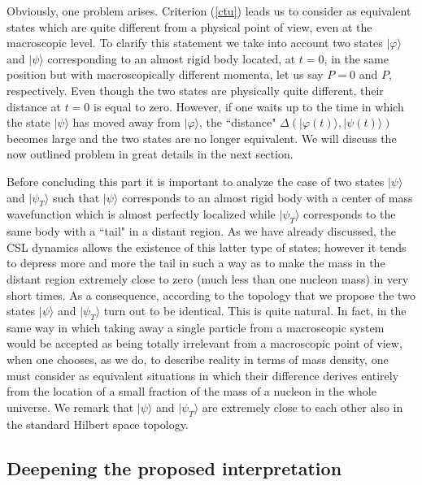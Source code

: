 \documentclass[10pt,a4paper]{article}
\begin{document}
Obviously, one problem arises. Criterion (\ref{ctu}) leads us to
consider as equivalent states which are quite different from a
physical point of view, even at the macroscopic level. To clarify
this statement we take into account two states $|\varphi\rangle$
and $|\psi\rangle$ corresponding to an almost rigid body located,
at $t = 0$, in the same position but with macroscopically
different momenta, let us say $P = 0$ and $P$, respectively. Even
though the two states are physically quite different, their
distance at $t = 0$ is equal to zero. However, if one waits up to
the time in which the state $|\psi\rangle$ has moved away from
$|\varphi\rangle$, the ``distance" $\Delta(|\varphi(t)\rangle,
|\psi(t)\rangle)$ becomes large and the two states are no longer
equivalent. We will discuss the now outlined problem in great
details in the next section.

Before concluding this part it is important to analyze the case of
two states $|\psi\rangle$ and $|\psi_{T}\rangle$ such that
$|\psi\rangle$ corresponds to an almost rigid body with a center
of mass wavefunction which is almost perfectly localized while
$|\psi_{T}\rangle$ corresponds to the same body with a ``tail" in a
distant region. As we have already discussed, the CSL dynamics allows the
existence of this latter type of states; however it tends to
depress more and more the tail in such a way as to make the mass
in the distant region extremely close to zero (much less than one
nucleon mass) in very short times. As a consequence, according to
the topology that we propose the two states $|\psi\rangle$ and
$|\psi_{T}\rangle$ turn out to be identical. This is quite
natural. In fact, in the same way in which taking away a single
particle from a macroscopic system would be accepted as being
totally irrelevant from a macroscopic point of view, when one
chooses, as we do, to describe reality in terms of mass density,
one must consider as equivalent situations in which their
difference derives entirely from the location of a small fraction
of the mass of a nucleon in the whole universe. We remark that
$|\psi\rangle$ and $|\psi_{T}\rangle$ are extremely close to each
other also in the standard Hilbert space topology.


\subsection{Deepening the proposed interpretation} \label{sec125}
\end{document}
